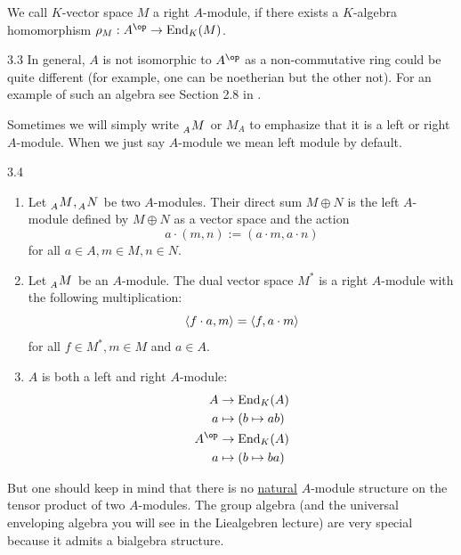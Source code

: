 \documentclass[twoside = false,	%
		headsepline,		%
		parskip = true,
		]{scrbook}						%
\begin{document}
        We call $K$-vector space $M$ a right $A$-module, if there exists a $K$-algebra homomorphism $\rho_M: A^\op \to \End_K(M)$.

        \begin{remark}{}{3.3}
            In general, $A$ is not isomorphic to $A^\op$ as a non-commutative ring could be quite different (for example, one can be noetherian but the other not). For an example of such an algebra see Section 2.8 in \cite{Jacobson.2009}.
        \end{remark}
        Sometimes we will simply write $\tensor[_A]{M}{}$ or $M_A$ to emphasize that it is a left or right $A$-module. When we just say $A$-module we mean left module by default.

        \begin{example}{}{3.4}
            \begin{enumerate}
                \item
                    Let $\tensor[_A]{M}{}, \tensor[_A]{N}{}$ be two $A$-modules. Their direct sum $M \oplus N$ is the left $A$-module defined by $M \oplus N$ as a vector space and the action
                    \begin{equation*}
                        a\cdot(m,n):=(a \cdot m, a \cdot n)
                    \end{equation*}
                    for all $a \in A, m \in M, n\in N$.
                \item
                    Let $\tensor[_A]{M}{}$ be an $A$-module. The dual vector space $M^*$ is a right $A$-module with the following multiplication:
                    \begin{equation*}
                        \left\langle f\cdot a, m\right\rangle = \left\langle f,a \cdot m\right\rangle
                    \end{equation*}
                    for all $f \in M^*, m \in M$ and $a \in A$.
                \item
                    $A$ is both a left and right $A$-module:
                    \begin{equation*}
                    \begin{split}
                        A &\to \End_K(A) \\
                        a &\mapsto (b \mapsto ab) \\
                        A^\op &\to \End_K(A) \\
                            a &\mapsto (b \mapsto ba)
                    \end{split}
                    \end{equation*}
            \end{enumerate}
        \end{example}
        But one should keep in mind that there is no \underline{natural} $A$-module structure on the tensor product of two $A$-modules. The group algebra (and the universal enveloping algebra you will see in the Liealgebren lecture) are very special because it admits a bialgebra structure.
\end{document}
